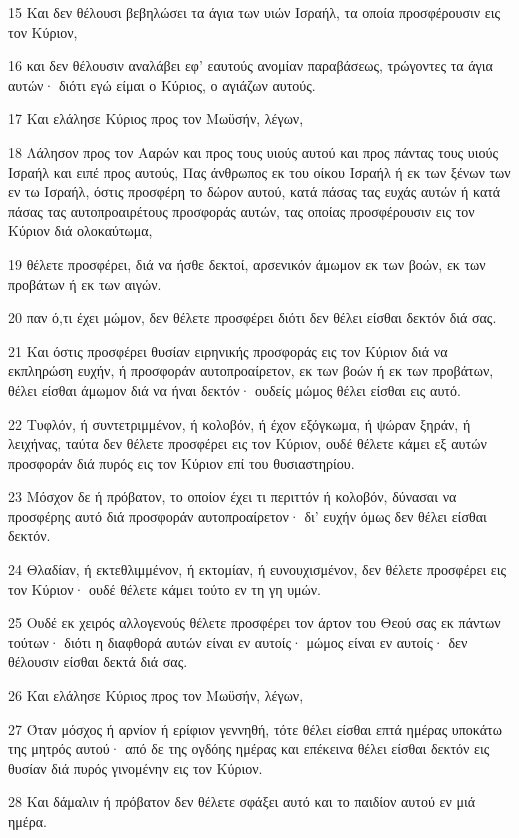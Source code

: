 \par 15 Και δεν θέλουσι βεβηλώσει τα άγια των υιών Ισραήλ, τα οποία προσφέρουσιν εις τον Κύριον,
\par 16 και δεν θέλουσιν αναλάβει εφ' εαυτούς ανομίαν παραβάσεως, τρώγοντες τα άγια αυτών· διότι εγώ είμαι ο Κύριος, ο αγιάζων αυτούς.
\par 17 Και ελάλησε Κύριος προς τον Μωϋσήν, λέγων,
\par 18 Λάλησον προς τον Ααρών και προς τους υιούς αυτού και προς πάντας τους υιούς Ισραήλ και ειπέ προς αυτούς, Πας άνθρωπος εκ του οίκου Ισραήλ ή εκ των ξένων των εν τω Ισραήλ, όστις προσφέρη το δώρον αυτού, κατά πάσας τας ευχάς αυτών ή κατά πάσας τας αυτοπροαιρέτους προσφοράς αυτών, τας οποίας προσφέρουσιν εις τον Κύριον διά ολοκαύτωμα,
\par 19 θέλετε προσφέρει, διά να ήσθε δεκτοί, αρσενικόν άμωμον εκ των βοών, εκ των προβάτων ή εκ των αιγών.
\par 20 παν ό,τι έχει μώμον, δεν θέλετε προσφέρει διότι δεν θέλει είσθαι δεκτόν διά σας.
\par 21 Και όστις προσφέρει θυσίαν ειρηνικής προσφοράς εις τον Κύριον διά να εκπληρώση ευχήν, ή προσφοράν αυτοπροαίρετον, εκ των βοών ή εκ των προβάτων, θέλει είσθαι άμωμον διά να ήναι δεκτόν· ουδείς μώμος θέλει είσθαι εις αυτό.
\par 22 Τυφλόν, ή συντετριμμένον, ή κολοβόν, ή έχον εξόγκωμα, ή ψώραν ξηράν, ή λειχήνας, ταύτα δεν θέλετε προσφέρει εις τον Κύριον, ουδέ θέλετε κάμει εξ αυτών προσφοράν διά πυρός εις τον Κύριον επί του θυσιαστηρίου.
\par 23 Μόσχον δε ή πρόβατον, το οποίον έχει τι περιττόν ή κολοβόν, δύνασαι να προσφέρης αυτό διά προσφοράν αυτοπροαίρετον· δι' ευχήν όμως δεν θέλει είσθαι δεκτόν.
\par 24 Θλαδίαν, ή εκτεθλιμμένον, ή εκτομίαν, ή ευνουχισμένον, δεν θέλετε προσφέρει εις τον Κύριον· ουδέ θέλετε κάμει τούτο εν τη γη υμών.
\par 25 Ουδέ εκ χειρός αλλογενούς θέλετε προσφέρει τον άρτον του Θεού σας εκ πάντων τούτων· διότι η διαφθορά αυτών είναι εν αυτοίς· μώμος είναι εν αυτοίς· δεν θέλουσιν είσθαι δεκτά διά σας.
\par 26 Και ελάλησε Κύριος προς τον Μωϋσήν, λέγων,
\par 27 Όταν μόσχος ή αρνίον ή ερίφιον γεννηθή, τότε θέλει είσθαι επτά ημέρας υποκάτω της μητρός αυτού· από δε της ογδόης ημέρας και επέκεινα θέλει είσθαι δεκτόν εις θυσίαν διά πυρός γινομένην εις τον Κύριον.
\par 28 Και δάμαλιν ή πρόβατον δεν θέλετε σφάξει αυτό και το παιδίον αυτού εν μιά ημέρα.
